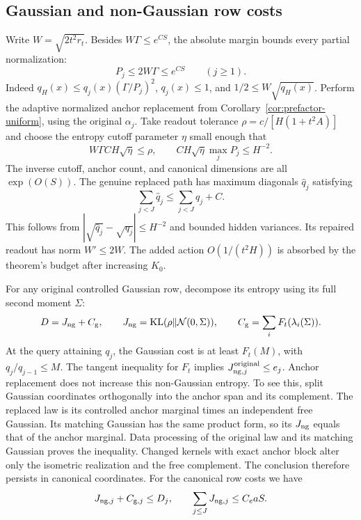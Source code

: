\documentclass[11pt]{article}
\theoremstyle{remark}
\newcommand{\KL}{\operatorname{KL}}
\begin{document}
\subsection{Gaussian and non-Gaussian row costs}

Write $W=\sqrt{2t^2r_t}$. Besides $W\Gamma\le e^{CS}$,
the absolute margin bounds every partial normalization:
\begin{equation}
 P_j\le2W\Gamma\le e^{CS}\qquad(j\ge1).
 \label{eq:uniform-partial-gain}
\end{equation}
Indeed $q_H(x)\le q_j(x)(\Gamma/P_j)^2$,
$q_j(x)\le1$, and $1/2\le W\sqrt{q_H(x)}$.
Perform the adaptive normalized anchor replacement from
Corollary~\ref{cor:prefactor-uniform}, using the original
$\alpha_j$. Take readout tolerance
$\rho=c/[H(1+t^2A)]$ and choose the entropy cutoff parameter
$\eta$ small enough that
\[
 W\Gamma CH\sqrt\eta\le\rho,\qquad
 CH\sqrt\eta\max_jP_j\le H^{-2}.
\]
The inverse cutoff, anchor count, and canonical dimensions are
all $\exp(O(S))$. The genuine replaced path has maximum
diagonals $\widehat q_j$ satisfying
\begin{equation}
 \sum_{j<J}\widehat q_j\le\sum_{j<J}q_j+C.
 \label{eq:uniform-variance-transfer}
\end{equation}
This follows from
$|\sqrt{\widehat q_j}-\sqrt{q_j}|\le H^{-2}$ and bounded
hidden variances. Its repaired readout has norm $W'\le2W$.
The added action $O(1/(t^2H))$ is absorbed by the theorem's
budget after increasing $K_0$.

For any original controlled Gaussian row, decompose its entropy
using its full second moment $\Sigma$:
\[
 D=J_{\rm ng}+C_{\rm g},\qquad
 J_{\rm ng}=\KL(\rho\Vert\mathcal N(0,\Sigma)),\qquad
 C_{\rm g}=\sum_iF_t(\lambda_i(\Sigma)).
\]
At the query attaining $q_j$, the Gaussian cost is at least
$F_t(M)$, with $q_j/q_{j-1}\le M$.
The tangent inequality for $F_t$ implies
$J_{{\rm ng},j}^{\rm original}\le e_j$.
Anchor replacement does not increase this non-Gaussian entropy.
To see this, split Gaussian coordinates orthogonally into the
anchor span and its complement. The replaced law is its
controlled anchor marginal times an independent free Gaussian.
Its matching Gaussian has the same product form, so its
$J_{\rm ng}$ equals that of the anchor marginal.
Data processing of the original law and its matching Gaussian
proves the inequality. Changed kernels with exact anchor block
alter only the isometric realization and the free complement.
The conclusion therefore persists in canonical coordinates.
For the canonical row costs we have
\begin{equation}
 J_{{\rm ng},j}+C_{{\rm g},j}\le D_j,\qquad
 \sum_{j\le J}J_{{\rm ng},j}\le C_eaS.
 \label{eq:uniform-ng-budget}
\end{equation}
\end{document}
